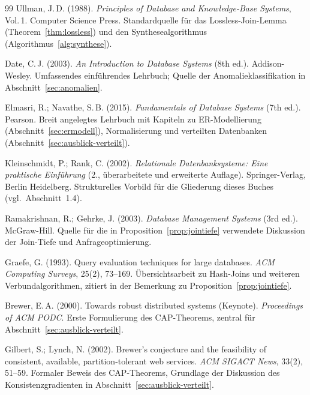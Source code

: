 ﻿\documentclass[a4paper,12pt]{report}
\theoremstyle{definition}
\theoremstyle{remark}
\begin{document}
\begin{thebibliography}{99}
Ullman, J.\,D. (1988).
\newblock \emph{Principles of Database and Knowledge-Base Systems}, Vol.\,1.
\newblock Computer Science Press.
\newblock Standardquelle für das Lossless-Join-Lemma
(Theorem~\ref{thm:lossless}) und den Synthesealgorithmus
(Algorithmus~\ref{alg:synthese}).

Date, C.\,J. (2003).
\newblock \emph{An Introduction to Database Systems} (8th ed.).
\newblock Addison-Wesley.
\newblock Umfassendes einführendes Lehrbuch; Quelle der
Anomalieklassifikation in Abschnitt~\ref{sec:anomalien}.

Elmasri, R.; Navathe, S.\,B. (2015).
\newblock \emph{Fundamentals of Database Systems} (7th ed.).
\newblock Pearson.
\newblock Breit angelegtes Lehrbuch mit Kapiteln zu ER-Modellierung
(Abschnitt~\ref{sec:ermodell}), Normalisierung und verteilten
Datenbanken (Abschnitt~\ref{sec:ausblick-verteilt}).

Kleinschmidt, P.; Rank, C. (2002).
\newblock \emph{Relationale Datenbanksysteme: Eine praktische Einführung}
(2., überarbeitete und erweiterte Auflage).
\newblock Springer-Verlag, Berlin Heidelberg.
\newblock Strukturelles Vorbild für die Gliederung dieses Buches
(vgl.\ Abschnitt~1.4).

Ramakrishnan, R.; Gehrke, J. (2003).
\newblock \emph{Database Management Systems} (3rd ed.).
\newblock McGraw-Hill.
\newblock Quelle für die in Proposition~\ref{prop:jointiefe} verwendete
Diskussion der Join-Tiefe und Anfrageoptimierung.

Graefe, G. (1993).
\newblock Query evaluation techniques for large databases.
\newblock \emph{ACM Computing Surveys}, 25(2), 73--169.
\newblock Übersichtsarbeit zu Hash-Joins und weiteren
Verbundalgorithmen, zitiert in der Bemerkung zu
Proposition~\ref{prop:jointiefe}.

Brewer, E.\,A. (2000).
\newblock Towards robust distributed systems (Keynote).
\newblock \emph{Proceedings of ACM PODC}.
\newblock Erste Formulierung des CAP-Theorems, zentral für
Abschnitt~\ref{sec:ausblick-verteilt}.

Gilbert, S.; Lynch, N. (2002).
\newblock Brewer's conjecture and the feasibility of consistent, available,
partition-tolerant web services.
\newblock \emph{ACM SIGACT News}, 33(2), 51--59.
\newblock Formaler Beweis des CAP-Theorems, Grundlage der Diskussion
des Konsistenzgradienten in Abschnitt~\ref{sec:ausblick-verteilt}.


\end{thebibliography}
\end{document}
